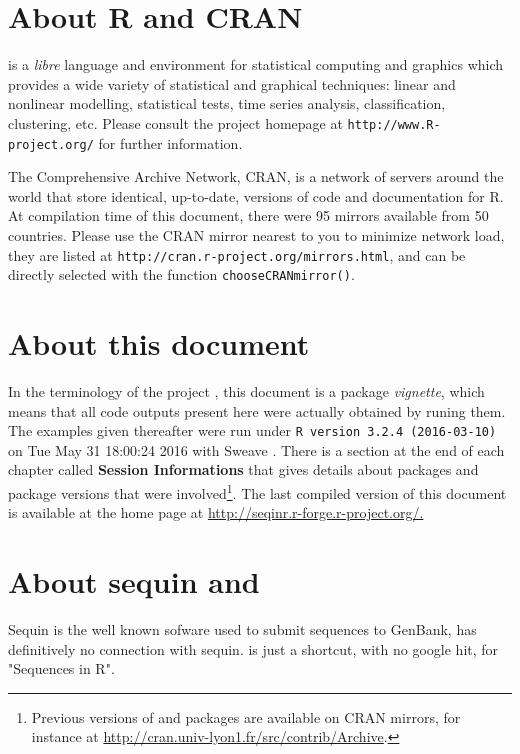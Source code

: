 \documentclass{article}
\begin{document}
\section{About R and CRAN}

\Rlogo{} \cite{R, RfromR} is a \emph{libre} language and environment for statistical computing and graphics 
which provides a wide variety of statistical and graphical techniques: linear and 
nonlinear modelling, statistical tests, time series analysis, classification, clustering, etc. 
Please consult the \Rlogo{} project homepage at \texttt{http://www.R-project.org/} for 
further information. 


The Comprehensive \Rlogo{} Archive Network, CRAN, is a network of servers 
around the world that store identical, up-to-date, versions of code and documentation 
for R. At compilation time of this document, there were
95 
mirrors available 
from 50 countries.
Please use the CRAN mirror nearest to you to minimize network load, they are
listed at \texttt{http://cran.r-project.org/mirrors.html}, and can be directly
selected with the function \texttt{chooseCRANmirror()}.

\section{About this document}

In the terminology of the \Rlogo{} project \cite{R, RfromR}, this document 
is a package \emph{vignette}, which means that all code outputs present 
here were actually obtained by runing them.
The examples given thereafter were run under \texttt{R version 3.2.4 (2016-03-10)}
on Tue May 31 18:00:24 2016 with Sweave \cite{Sweave}. There is a section at the end of
each chapter called \textbf{Session Informations} that gives details about
packages and package versions that were involved\footnote{
Previous versions of \Rlogo{} and packages are available on CRAN mirrors,
for instance at \url{http://cran.univ-lyon1.fr/src/contrib/Archive}.
}.
The last compiled version of this document is available at the \seqinr{}
home page at \url{http://seqinr.r-forge.r-project.org/.}


\section{About sequin and \seqinr{}}

Sequin is the well known sofware used to submit sequences to GenBank, \seqinr{}
\cite{seqinr} has definitively no connection with sequin. \seqinr{} is just a shortcut, with
no google hit, for "Sequences in R".
\end{document}
